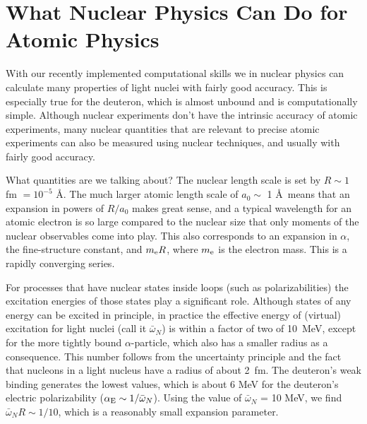 \documentclass{svmult}
\begin{document}
\section{What Nuclear Physics Can Do for Atomic Physics}

With our recently implemented computational skills we in nuclear physics can
calculate many properties of light nuclei with fairly good accuracy.  This is
especially true for the deuteron, which is almost unbound and is computationally
simple.  Although nuclear experiments don't have the intrinsic accuracy of
atomic experiments, many nuclear quantities that are relevant to precise atomic
experiments can also be measured using nuclear techniques, and usually with
fairly good accuracy.

What quantities are we talking about?  The nuclear length
scale is set by $R \sim 1$ fm $= 10^{-5}$ \AA.  The much
larger atomic length scale of $a_0 \sim $ 1 \AA\ means that an expansion in
powers of $R/a_0$ makes great sense, and a typical wavelength for an atomic
electron is so large compared to the nuclear size that only moments of the
nuclear observables come into play. This also corresponds to an expansion in
$\alpha$, the fine-structure constant, and $m_{\rm e} R$, where $m_{\rm e}$ is
the electron mass. This is a rapidly converging series.

For processes that have nuclear states inside loops (such as polarizabilities)
the excitation energies of those states play a significant role. Although states
of any energy can be excited in principle, in practice the effective energy of
(virtual) excitation for light nuclei (call it $\bar{\omega}_N$) is within a
factor of two of 10~MeV, except for the more tightly bound $\alpha$-particle,
which also has a smaller radius as a consequence. This number follows from
the uncertainty principle and the fact that nucleons in a light nucleus
have a radius of about 2~fm. The deuteron's weak binding generates the lowest
values, which is about 6 MeV for the deuteron's
electric
polarizability ($\alpha_{\rm E} \sim
1/\bar{\omega}_N$). Using the value of $\bar{\omega}_N$ = 10 MeV, we find
$\bar{\omega}_N R \sim 1/10$, which is a reasonably small expansion parameter.
\end{document}
